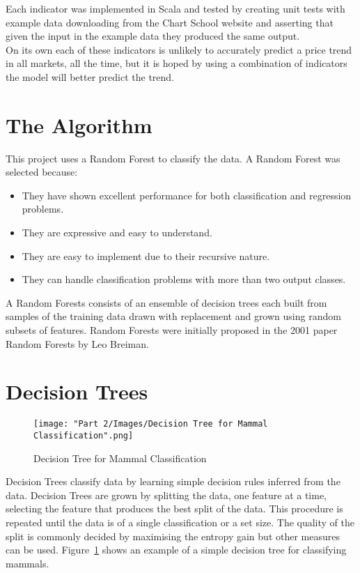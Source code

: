 	Each indicator was implemented in Scala and tested by creating unit tests with example data downloading from the Chart School website\cite{technicalIndicators} and asserting that given the input in the example data they produced the same output.\\
	
	 On its own each of these indicators is unlikely to accurately predict a price trend in all markets, all the time, but it is hoped by using a combination of indicators the model will better predict the trend.\\

	\section{The Algorithm}
	This project uses a Random Forest to classify the data. A Random Forest was selected because:
		
		\begin{itemize}
			\item They have shown excellent performance for both classification and regression problems.
			\item They are expressive and easy to understand\cite{Flach:2012:MLA:2490546}.
			\item They are easy to implement due to their recursive nature\cite{Flach:2012:MLA:2490546}.
			\item They can handle classification problems with more than two output classes.
		\end{itemize}		 
		
		A Random Forests consists of an ensemble of decision trees each built from samples of the training data drawn with replacement and grown using random subsets of features. Random Forests were initially proposed in the 2001 paper Random Forests by Leo Breiman\cite{breiman2001random}.
		
	\section{Decision Trees}
		\begin{figure}[H]
			\texttt{[image: "Part 2/Images/Decision Tree for Mammal Classification".png]}
			\centering
			\caption{Decision Tree for Mammal Classification}
    			\label{fig:decisionTree}
		\end{figure}		
		
		Decision Trees classify data by learning simple decision rules inferred from the data. Decision Trees are grown by splitting the data, one feature at a time, selecting the feature that produces the best split of the data. This procedure is repeated until the data is of a single classification or a set size. The quality of the split is commonly decided by maximising the entropy gain but other measures can be used. Figure~\ref{fig:decisionTree} shows an example of a simple decision tree for classifying mammals.
		
